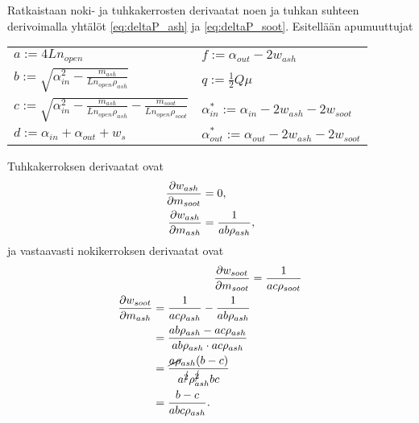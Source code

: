 Ratkaistaan noki- ja tuhkakerrosten derivaatat noen ja tuhkan suhteen derivoimalla yhtälöt \eqref{eq:deltaP_ash} ja \eqref{eq:deltaP_soot}.
Esitellään apumuuttujat
\begin{center}
\begin{tabular}{ll}
    \( a := 4 L n_{open} \) & \( f := \alpha_{out} - 2 w_{ash} \) \\
    \( b := \sqrt{\alpha_{in}^2 - \frac{m_{ash}}{L n_{open} \rho_{ash}}} \) & \( q := \frac{1}{2} Q \mu \) \\
    \( c := \sqrt{\alpha_{in}^2 - \frac{m_{ash}}{L n_{open} \rho_{ash}} - \frac{m_{soot}}{L n_{open} \rho_{soot}}} \) & \( \alpha_{in}^* := \alpha_{in} - 2 w_{ash} - 2 w_{soot} \) \\
    \( d := \alpha_{in} + \alpha_{out} + w_s \) & \( \alpha_{out}^* := \alpha_{out} - 2 w_{ash} - 2 w_{soot} \)
\end{tabular}
\end{center}


Tuhkakerroksen derivaatat ovat
\begin{align}
    \frac{\partial w_{ash}}{\partial m_{soot}} & =0,\\
    \frac{\partial w_{ash}}{\partial m_{ash}} &= \frac{1}{ab\rho_{ash}},
\end{align}
ja vastaavasti nokikerroksen derivaatat ovat
\begin{align}
    \frac{\partial w_{soot}}{\partial m_{soot}} &= \frac{1}{ac\rho_{soot}}\\
    \begin{split}
    \frac{\partial w_{soot}}{\partial m_{ash}} &= \frac{1}{ac\rho_{ash}}-\frac{1}{ab\rho_{ash}}
    \\ &= \frac{ab \rho_{ash} - ac\rho_{ash}}{ab\rho_{ash}\cdot ac \rho_{ash}}
    \\ &= \frac{\cancel{a\rho}_{ash}(b-c)}{a^{\cancel{2}} \rho_{ash}^{\cancel{2}} bc}
    \\ &= \frac{b-c}{abc\rho_{ash}}.
    \end{split}
\end{align}

